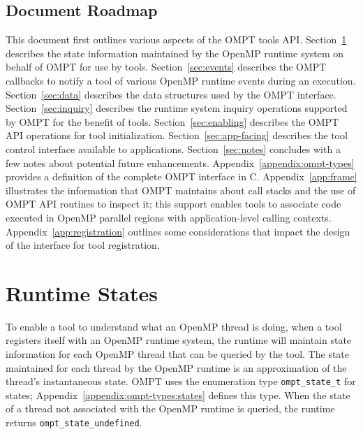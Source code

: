 \documentclass{article}
\begin{document}
\subsection{Document Roadmap}
This document first outlines various aspects of the OMPT tools API. 
Section~\ref{sec:states} describes the state information maintained by the OpenMP runtime system on behalf of OMPT for use by tools.
Section~\ref{sec:events} describes the OMPT callbacks to notify a tool of various OpenMP runtime events during an execution.
Section~\ref{sec:data} describes the data structures used by the OMPT interface.
Section~\ref{sec:inquiry} describes the runtime system inquiry operations supported by OMPT for the benefit of tools.
Section~\ref{sec:enabling} describes the OMPT API operations for tool initialization.
Section~\ref{sec:app-facing} describes the tool control interface available to applications.
Section~\ref{sec:notes} concludes with a few notes about potential future enhancements.
Appendix~\ref{appendix:ompt-types} provides a definition of the complete OMPT interface in C.
Appendix~\ref{app:frame} illustrates the information that OMPT maintains about call stacks and the use of OMPT API routines to inspect it; this support enables tools to associate code executed in OpenMP parallel regions with  application-level calling contexts. 
Appendix~\ref{app:registration} outlines some considerations that impact the design of the interface for tool registration.

\section{Runtime States} 
\label{sec:states} 

To enable a tool to understand what an OpenMP thread is doing, when a tool registers itself with an OpenMP runtime system, the runtime 
will maintain state information for each OpenMP thread that can be queried by the tool. 
The state maintained for each thread by the OpenMP runtime is an
approximation of the thread's instantaneous state. 
OMPT uses the enumeration type \verb|ompt_state_t| for states;
Appendix~\ref{appendix:ompt-types:states} defines this type.
When the state of a thread not associated with the OpenMP runtime is queried, the runtime returns 
\verb|ompt_state_undefined|.
\end{document}
